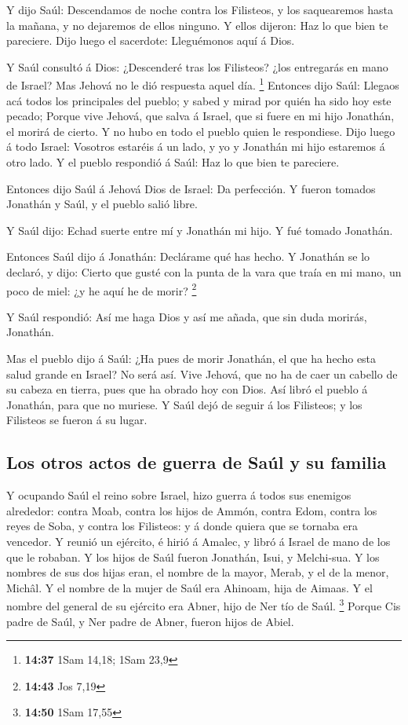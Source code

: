 Y dijo Saúl: Descendamos de noche contra los Filisteos, y
los saquearemos hasta la mañana, y no dejaremos de ellos ninguno. Y
ellos dijeron: Haz lo que bien te pareciere. Dijo luego el sacerdote:
Lleguémonos aquí á Dios.

 Y Saúl consultó á Dios: ¿Descenderé tras los Filisteos?
¿los entregarás en mano de Israel? Mas Jehová no le dió respuesta aquel
día. \footnote{\textbf{14:37} 1Sam 14,18; 1Sam 23,9} 
Entonces dijo Saúl: Llegaos acá todos los principales del pueblo; y
sabed y mirad por quién ha sido hoy este pecado;  Porque
vive Jehová, que salva á Israel, que si fuere en mi hijo Jonathán, el
morirá de cierto. Y no hubo en todo el pueblo quien le respondiese.
 Dijo luego á todo Israel: Vosotros estaréis á un lado, y
yo y Jonathán mi hijo estaremos á otro lado. Y el pueblo respondió á
Saúl: Haz lo que bien te pareciere.

 Entonces dijo Saúl á Jehová Dios de Israel: Da perfección.
Y fueron tomados Jonathán y Saúl, y el pueblo salió libre.

 Y Saúl dijo: Echad suerte entre mí y Jonathán mi hijo. Y
fué tomado Jonathán.

 Entonces Saúl dijo á Jonathán: Declárame qué has hecho. Y
Jonathán se lo declaró, y dijo: Cierto que gusté con la punta de la vara
que traía en mi mano, un poco de miel: ¿y he aquí he de morir?
\footnote{\textbf{14:43} Jos 7,19}

 Y Saúl respondió: Así me haga Dios y así me añada, que sin
duda morirás, Jonathán.

 Mas el pueblo dijo á Saúl: ¿Ha pues de morir Jonathán, el
que ha hecho esta salud grande en Israel? No será así. Vive Jehová, que
no ha de caer un cabello de su cabeza en tierra, pues que ha obrado hoy
con Dios. Así libró el pueblo á Jonathán, para que no muriese.
 Y Saúl dejó de seguir á los Filisteos; y los Filisteos se
fueron á su lugar.

\hypertarget{los-otros-actos-de-guerra-de-sauxfal-y-su-familia}{%
\subsection{Los otros actos de guerra de Saúl y su
familia}\label{los-otros-actos-de-guerra-de-sauxfal-y-su-familia}}

 Y ocupando Saúl el reino sobre Israel, hizo guerra á todos
sus enemigos alrededor: contra Moab, contra los hijos de Ammón, contra
Edom, contra los reyes de Soba, y contra los Filisteos: y á donde quiera
que se tornaba era vencedor.  Y reunió un ejército, é hirió
á Amalec, y libró á Israel de mano de los que le robaban. 
Y los hijos de Saúl fueron Jonathán, Isui, y Melchi-sua. Y los nombres
de sus dos hijas eran, el nombre de la mayor, Merab, y el de la menor,
Michâl.  Y el nombre de la mujer de Saúl era Ahinoam, hija
de Aimaas. Y el nombre del general de su ejército era Abner, hijo de Ner
tío de Saúl. \footnote{\textbf{14:50} 1Sam 17,55}  Porque
Cis padre de Saúl, y Ner padre de Abner, fueron hijos de Abiel.


